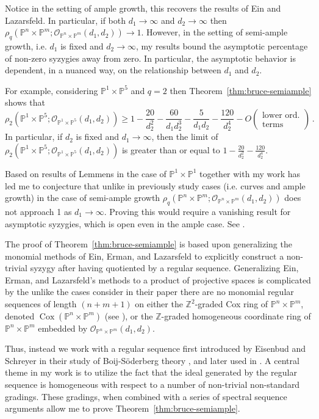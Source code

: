 \documentclass[10pt,reqno]{amsart}
\theoremstyle{remark}
\newcommand{\Cox}{\operatorname{Cox}}
\renewcommand{\O}{\mathcal{O}}
\renewcommand{\P}{\mathbb{P}}
\newcommand{\Z}{\mathbb{Z}}
\begin{document}
Notice in the setting of ample growth, this recovers the results of Ein and Lazarsfeld. In particular, if both $d_{1}\to \infty$ and $d_{2}\to\infty$ then $\rho_{q}\left(\P^{n}\times\P^{m}; \O_{\P^{n}\times\P^{m}}(d_1,d_2)\right)\to 1$. However, in the setting of semi-ample growth, i.e. $d_{1}$ is fixed and $d_{2}\to \infty$, my results bound the asymptotic percentage of non-zero syzygies away from zero. In particular, the asymptotic behavior is dependent, in a nuanced way, on the relationship between $d_{1}$ and $d_{2}$. 

For example, considering $\P^{1}\times\P^{5}$ and $q=2$ then Theorem~\ref{thm:bruce-semiample} shows that 
\[
\rho_{2}\left(\P^{1}\times\P^{5}; \O_{\P^{1}\times\P^{5}}(d_1,d_2)\right)\geq1-\frac{20}{d_2^2}-\frac{60}{d_1d_2^3}-\frac{5}{d_1d_2}-\frac{120}{d_2^4}-O\left(\begin{matrix}\text{lower ord.}\\ \text{terms}\end{matrix}\right)\,.
\]
In particular, if $d_2$ is fixed and $d_1\to\infty$, then the limit of $\rho_{2}\left(\P^{1}\times\P^{5}; \O_{\P^{1}\times\P^{5}}(d_1,d_2)\right)$ is greater than or equal to $1-\frac{20}{d^2_2}-\frac{120}{d_2^4}$.

Based on results of Lemmens in the case of $\P^1\times\P^1$ together with my work has led me to conjecture that unlike in previously study cases (i.e. curves and ample growth) in the case of semi-ample growth $\rho_{q}\left(\P^{n}\times\P^{m}; \O_{\P^{n}\times\P^{m}}(d_1,d_2)\right)$ does not approach 1 as $d_{1}\to \infty$. Proving this would require a vanishing result for asymptotic syzygies, which is open even in the ample case. See \cite[Conjecture~7.1, Conjecture~7.5]{einLazarsfeld12}.

The proof of Theorem~\ref{thm:bruce-semiample} is based upon generalizing the monomial methods of Ein, Erman, and Lazarsfeld to explicitly construct a non-trivial syzygy after having quotiented by a regular sequence. Generalizing Ein, Erman, and Lazarsfeld's methods to a product of projective spaces is complicated by the unlike the cases consider in their paper there are no monomial regular sequences of length $(n+m+1)$ on either the $\Z^2$-graded Cox ring of $\P^{n}\times\P^{m}$, denoted $\Cox(\P^{n}\times\P^{m})$ (see \cite{cox95}), or the $\Z$-graded homogeneous coordinate ring of $\P^{n}\times\P^{m}$ embedded by $\O_{\P^{n}\times\P^{m}}(d_{1},d_{2})$.

Thus, instead we work with a regular sequence first introduced by Eisenbud and Schreyer in their study of Boij-S\"{o}derberg theory \cite{eisenbudSchreyer09}, and later used in \cite{berkesch13, oeding17}. A central theme in my work is to utilize the fact that the ideal generated by the regular sequence is homogeneous with respect to a number of non-trivial non-standard gradings. These gradings, when combined with a series of spectral sequence arguments allow me to prove Theorem~\ref{thm:bruce-semiample}.
\end{document}
